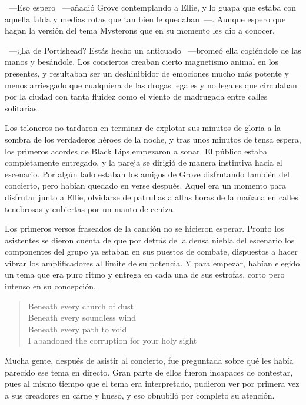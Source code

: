 ~---Eso espero ~---añadió Grove contemplando a Ellie, y lo guapa que estaba con aquella falda y medias rotas que tan bien le quedaban~---. Aunque espero que hagan la versión del tema Mysterons que en su momento les dio a conocer.

~---¿La de Portishead? Estás hecho un anticuado ~---bromeó ella cogiéndole de las manos y besándole. Los conciertos creaban cierto magnetismo animal en los presentes, y resultaban ser un deshinibidor de emociones mucho más potente y menos arriesgado que cualquiera de las drogas legales y no legales que circulaban por la ciudad con tanta fluidez como el viento de madrugada entre calles solitarias.

Los teloneros no tardaron en terminar de explotar sus minutos de gloria a la sombra de los verdaderos héroes de la noche, y tras unos minutos de tensa espera, los primeros acordes de Black Lips empezaron a sonar. El público estaba completamente entregado, y la pareja se dirigió de manera instintiva hacia el escenario. Por algún lado estaban los amigos de Grove disfrutando también del concierto, pero habían quedado en verse después. Aquel era un momento para disfrutar junto a Ellie, olvidarse de patrullas a altas horas de la mañana en calles tenebrosas y cubiertas por un manto de ceniza.

Los primeros versos fraseados de la canción no se hicieron esperar. Pronto los asistentes se dieron cuenta de que por detrás de la densa niebla del escenario los componentes del grupo ya estaban en sus puestos de combate, dispuestos a hacer vibrar los amplificadores al límite de su potencia. Y para empezar, habían elegido un tema que era puro ritmo y entrega en cada una de sus estrofas, corto pero intenso en su concepción.

\begin{verse}
    \begin{em}
        Beneath every church of dust\\
        Beneath every soundless wind\\
        Beneath every path to void\\
        I abandoned the corruption for your holy sight
    \end{em}
\end{verse}

Mucha gente, después de asistir al concierto, fue preguntada sobre qué les había parecido ese tema en directo. Gran parte de ellos fueron incapaces de contestar, pues al mismo tiempo que el tema era interpretado, pudieron ver por primera vez a sus creadores en carne y hueso, y eso obnubiló por completo su atención.

